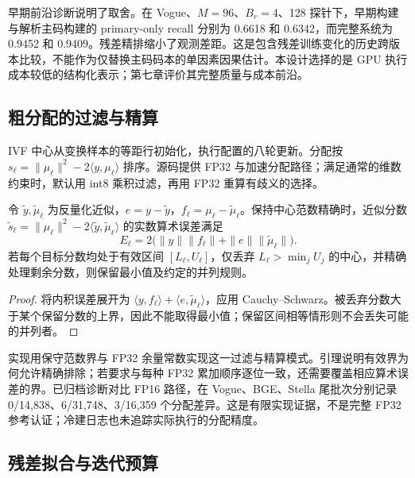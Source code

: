 早期前沿诊断说明了取舍。在 Vogue、$M=96$、$B_r=4$、128 探针下，早期构建与解析主码构建的 primary-only recall 分别为 0.6618 和 0.6342，而完整系统为 0.9452 和 0.9409。残差精排缩小了观测差距。这是包含残差训练变化的历史跨版本比较，不能作为仅替换主码码本的单因素因果估计。本设计选择的是 GPU 执行成本较低的结构化表示；第七章评价其完整质量与成本前沿。

\subsection{粗分配的过滤与精算}

IVF 中心从变换样本的等距行初始化，执行配置的八轮更新。分配按 $s_\ell=\|\mu_\ell\|^2-2\langle y,\mu_\ell\rangle$ 排序。源码提供 FP32 与加速分配路径；满足通常的维数约束时，默认用 int8 乘积过滤，再用 FP32 重算有歧义的选择。

\begin{resultblock}
\begin{lemma}[具有认证分数区间的分配]
\label{lem:4-assignment-bound}
令 $\widetilde y,\widetilde\mu_\ell$ 为反量化近似，$e=y-\widetilde y$，$f_\ell=\mu_\ell-\widetilde\mu_\ell$。保持中心范数精确时，近似分数
$\widetilde s_\ell=\|\mu_\ell\|^2-2\langle\widetilde y,\widetilde\mu_\ell\rangle$
的实数算术误差满足
\begin{equation}
 E_\ell=2\bigl(\|y\|\|f_\ell\|+\|e\|\|\widetilde\mu_\ell\|\bigr).
 \label{eq:4-assignment-bound}
\end{equation}
若每个目标分数均处于有效区间 $[L_\ell,U_\ell]$，仅丢弃 $L_\ell>\min_j U_j$ 的中心，并精确处理剩余分数，则保留最小值及约定的并列规则。
\end{lemma}
\begin{proof}
将内积误差展开为 $\langle y,f_\ell\rangle+\langle e,\widetilde\mu_\ell\rangle$，应用 Cauchy--Schwarz。被丢弃分数大于某个保留分数的上界，因此不能取得最小值；保留区间相等情形则不会丢失可能的并列者。
\end{proof}
\end{resultblock}

实现用保守范数界与 FP32 余量常数实现这一过滤与精算模式。引理说明有效界为何允许精确排除；若要求与每种 FP32 累加顺序逐位一致，还需要覆盖相应算术误差的界。已归档诊断对比 FP16 路径，在 Vogue、BGE、Stella 尾批次分别记录 0/14,838、6/31,748、3/16,359 个分配差异。这是有限实现证据，不是完整 FP32 参考认证；冷建日志也未追踪实际执行的分配精度。

\subsection{残差拟合与迭代预算}

